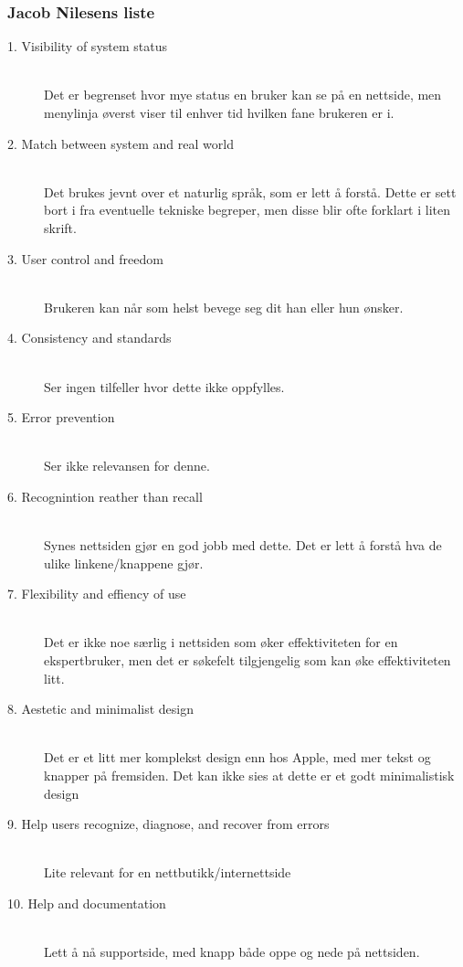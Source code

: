 \subsubsection{Jacob Nilesens liste}

\begin{description}
  \item[1. Visibility of system status] \hfill \\
    Det er begrenset hvor mye status en bruker kan se på en nettside, men menylinja øverst viser til enhver tid hvilken fane brukeren er i.
  \item[2. Match between system and real world] \hfill \\
    Det brukes jevnt over et naturlig språk, som er lett å forstå. Dette er sett bort i fra eventuelle tekniske begreper, men disse blir ofte forklart i liten skrift. 
  \item[3. User control and freedom] \hfill \\
    Brukeren kan når som helst bevege seg dit han eller hun ønsker. 
  \item[4. Consistency and standards] \hfill \\
    Ser ingen tilfeller hvor dette ikke oppfylles. 
  \item[5. Error prevention] \hfill \\
   Ser ikke relevansen for denne. 
  \item[6. Recognintion reather than recall] \hfill \\
  Synes nettsiden gjør en god jobb med dette. Det er lett å forstå hva de ulike linkene/knappene gjør.
  \item[7. Flexibility and effiency of use] \hfill \\
    Det er ikke noe særlig i nettsiden som øker effektiviteten for en ekspertbruker, men det er søkefelt tilgjengelig som kan øke effektiviteten litt. 
  \item[8. Aestetic and minimalist design] \hfill \\
    Det er et litt mer komplekst design enn hos Apple, med mer tekst og knapper på fremsiden. Det kan ikke sies at dette er et godt minimalistisk design
  \item[9. Help users recognize, diagnose, and recover from errors] \hfill \\
    Lite relevant for en nettbutikk/internettside  
  \item[10. Help and documentation] \hfill \\
   Lett å nå supportside, med knapp både oppe og nede på nettsiden. 
\end{description}

